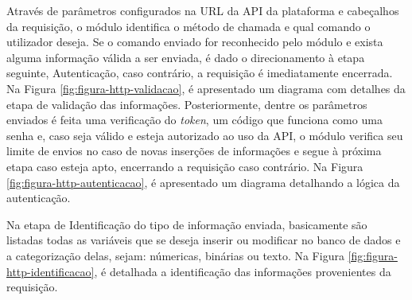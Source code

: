     	 Através de parâmetros configurados na \gls{URL} da \gls{API} da plataforma e cabeçalhos da requisição, o módulo identifica o método de chamada e qual comando o utilizador deseja. Se o comando enviado for reconhecido pelo módulo e exista alguma informação válida a ser enviada, é dado o direcionamento à etapa seguinte, Autenticação, caso contrário, a requisição é imediatamente encerrada. Na Figura \ref{fig:figura-http-validacao}, é apresentado um diagrama com detalhes da etapa de validação das informações.
\newpage
    	 Posteriormente, dentre os parâmetros enviados é feita uma verificação do \textit{token}, um código que funciona como uma senha e, caso seja válido e esteja autorizado ao uso da \gls{API}, o módulo verifica seu limite de envios no caso de novas inserções de informações e segue à próxima etapa caso esteja apto, encerrando a requisição caso contrário. Na Figura \ref{fig:figura-http-autenticacao}, é apresentado um diagrama detalhando a lógica da autenticação.
    	 
    	\begin{figure}[!h]
    	\end{figure}
    	
    	 Na etapa de Identificação do tipo de informação enviada, basicamente são listadas todas as variáveis que se deseja inserir ou modificar no banco de dados e a categorização delas, sejam: númericas, binárias ou texto. Na Figura \ref{fig:figura-http-identificacao}, é detalhada a identificação das informações provenientes da requisição.
    	
    	\begin{figure}[!h]
    	\end{figure}
    	
